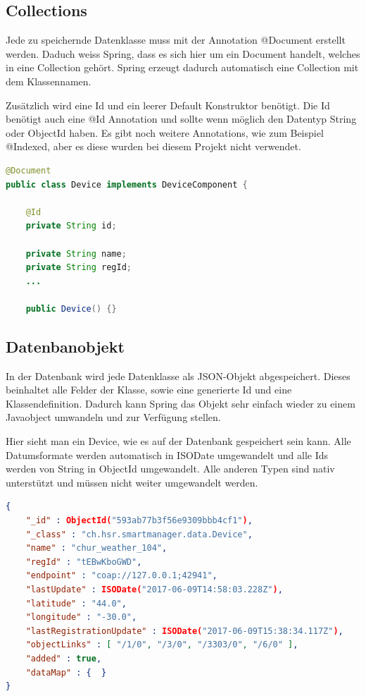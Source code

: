 \subsection{Collections}
Jede zu speichernde Datenklasse muss mit der Annotation @Document erstellt werden. Daduch weiss Spring, dass es sich hier um ein Document handelt, welches in eine Collection gehört. Spring erzeugt dadurch automatisch eine Collection mit dem Klassennamen.

Zusätzlich wird eine Id und ein leerer Default Konstruktor benötigt. Die Id benötigt auch eine @Id Annotation und sollte wenn möglich den Datentyp String oder ObjectId haben. Es gibt noch weitere Annotations, wie zum Beispiel @Indexed, aber es diese wurden bei diesem Projekt nicht verwendet. 
\begin{lstlisting}[language=java]
@Document
public class Device implements DeviceComponent {

	@Id
	private String id;

	private String name;
	private String regId;
	...
	
	public Device() {}
\end{lstlisting}

\subsection{Datenbanobjekt}
In der Datenbank wird jede Datenklasse als JSON-Objekt abgespeichert. Dieses beinhaltet alle Felder der Klasse, sowie eine generierte Id und eine Klassendefinition. Dadurch kann Spring das Objekt sehr einfach wieder zu einem Javaobject umwandeln und zur Verfügung stellen.

Hier sieht man ein Device, wie es auf der Datenbank gespeichert sein kann. Alle Datumsformate werden automatisch in ISODate umgewandelt und alle Ids werden von String in ObjectId umgewandelt. Alle anderen Typen sind nativ unterstützt und müssen nicht weiter umgewandelt werden.
\begin{lstlisting}[language=json]
{ 
	"_id" : ObjectId("593ab77b3f56e9309bbb4cf1"), 
	"_class" : "ch.hsr.smartmanager.data.Device", 
	"name" : "chur_weather_104", 
	"regId" : "tEBwKboGWD", 
	"endpoint" : "coap://127.0.0.1;42941", 
	"lastUpdate" : ISODate("2017-06-09T14:58:03.228Z"), 
	"latitude" : "44.0", 
	"longitude" : "-30.0", 
	"lastRegistrationUpdate" : ISODate("2017-06-09T15:38:34.117Z"),
	"objectLinks" : [ "/1/0", "/3/0", "/3303/0", "/6/0" ], 
	"added" : true, 
	"dataMap" : {  } 
}
\end{lstlisting}

